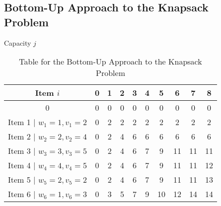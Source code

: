\documentclass{article}
\begin{document}
\subsection*{Bottom-Up Approach to the Knapsack Problem}
\begin{table}[ht]
    \centering
    Capacity $j$

    \begin{tabular}{c|c|c|c|c|c|c|c|c|c|}
        \hline
        \textbf{Item $i$}           & \textbf{0} & \textbf{1} & \textbf{2} & \textbf{3} & \textbf{4} & \textbf{5} & \textbf{6} & \textbf{7} & \textbf{8} \\
        \hline
        0                           & 0          & 0          & 0          & 0          & 0          & 0          & 0          & 0          & 0          \\
        \hline
        Item 1 | $w_1 = 1, v_1 = 2$ & 0          & 2          & 2          & 2          & 2          & 2          & 2          & 2          & 2          \\
        \hline
        Item 2 | $w_2 = 2, v_2 = 4$ & 0          & 2          & 4          & 6          & 6          & 6          & 6          & 6          & 6          \\
        \hline
        Item 3 | $w_3 = 3, v_3 = 5$ & 0          & 2          & 4          & 6          & 7          & 9          & 11         & 11         & 11         \\
        \hline
        Item 4 | $w_4 = 4, v_4 = 5$ & 0          & 2          & 4          & 6          & 7          & 9          & 11         & 11         & 12         \\
        \hline
        Item 5 | $w_5 = 2, v_5 = 2$ & 0          & 2          & 4          & 6          & 7          & 9          & 11         & 11         & 13         \\
        \hline
        Item 6 | $w_6 = 1, v_6 = 3$ & 0          & 3          & 5          & 7          & 9          & 10         & 12         & 14         & 14         \\
        \hline
    \end{tabular}
    \caption{Table for the Bottom-Up Approach to the Knapsack Problem}
    \label{tab:table4}
\end{table}
\end{document}
